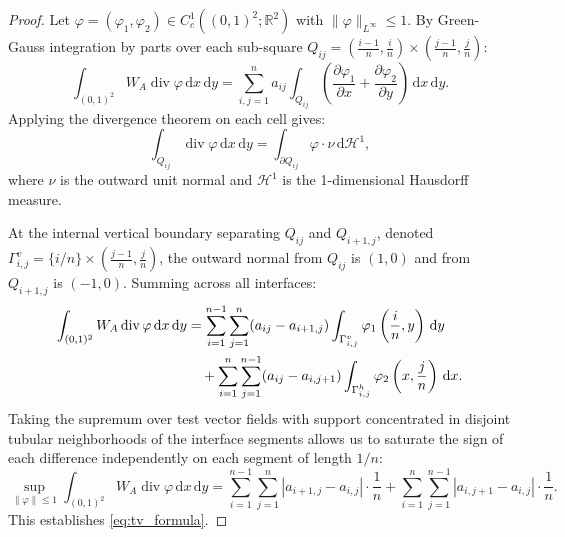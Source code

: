\documentclass[11pt,a4paper,reqno]{amsart}
\theoremstyle{definition}
\numberwithin{equation}{section}
\newcommand{\R}{\mathbb{R}}
\newcommand{\dif}{\,\mathrm{d}}
\begin{document}
\begin{proof}
Let $\varphi = (\varphi_1, \varphi_2) \in C_c^1((0,1)^2; \R^2)$ with $\|\varphi\|_{L^\infty} \le 1$. By Green-Gauss integration by parts over each sub-square $Q_{ij} = (\frac{i-1}{n}, \frac{i}{n}) \times (\frac{j-1}{n}, \frac{j}{n})$:
\begin{equation}
    \int_{(0,1)^2} W_A \operatorname{div} \varphi \dif x \dif y = \sum_{i,j=1}^n a_{ij} \int_{Q_{ij}} \left( \frac{\partial \varphi_1}{\partial x} + \frac{\partial \varphi_2}{\partial y} \right) \dif x \dif y.
\end{equation}
Applying the divergence theorem on each cell gives:
\begin{equation}
    \int_{Q_{ij}} \operatorname{div}\varphi \dif x \dif y = \int_{\partial Q_{ij}} \varphi \cdot \nu \dif \mathcal{H}^1,
\end{equation}
where $\nu$ is the outward unit normal and $\mathcal{H}^1$ is the 1-dimensional Hausdorff measure. 

At the internal vertical boundary separating $Q_{ij}$ and $Q_{i+1, j}$, denoted $\Gamma_{i, j}^v = \{i/n\} \times (\frac{j-1}{n}, \frac{j}{n})$, the outward normal from $Q_{ij}$ is $(1, 0)$ and from $Q_{i+1, j}$ is $(-1, 0)$. Summing across all interfaces:
\begin{align}
    \int_{(0,1)^2} W_A \operatorname{div} \varphi \dif x \dif y 
    &= \sum_{i=1}^{n-1} \sum_{j=1}^n (a_{ij} - a_{i+1, j}) \int_{\Gamma_{i,j}^v} \varphi_1\left(\frac{i}{n}, y\right) \dif y \notag \\
    &\quad + \sum_{i=1}^n \sum_{j=1}^{n-1} (a_{ij} - a_{i, j+1}) \int_{\Gamma_{i,j}^h} \varphi_2\left(x, \frac{j}{n}\right) \dif x.
\end{align}
Taking the supremum over test vector fields with support concentrated in disjoint tubular neighborhoods of the interface segments allows us to saturate the sign of each difference independently on each segment of length $1/n$:
\begin{equation}
    \sup_{\|\varphi\|\le 1} \int_{(0,1)^2} W_A \operatorname{div} \varphi \dif x \dif y = \sum_{i=1}^{n-1} \sum_{j=1}^n |a_{i+1, j} - a_{i,j}| \cdot \frac{1}{n} + \sum_{i=1}^n \sum_{j=1}^{n-1} |a_{i, j+1} - a_{i, j}| \cdot \frac{1}{n}.
\end{equation}
This establishes \eqref{eq:tv_formula}.
\end{proof}
\end{document}
